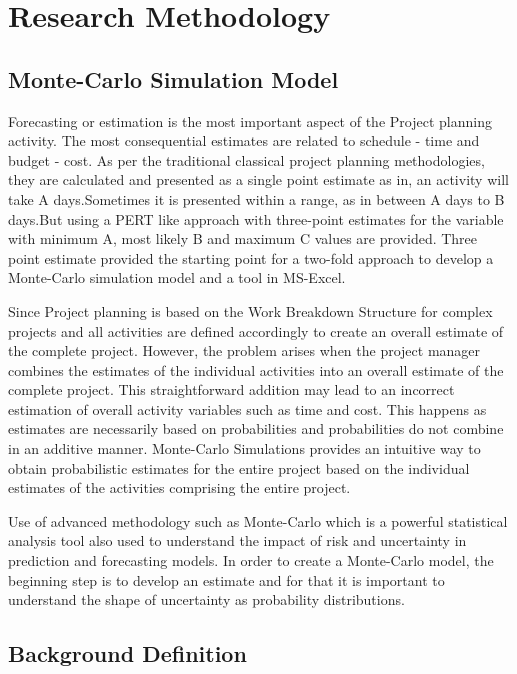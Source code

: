 \let\textcircled=\pgftextcircled
\chapter{Research Methodology}
\label{chap:RM}

\section{Monte-Carlo Simulation Model}

Forecasting or estimation is the most important aspect of the Project planning activity. The most consequential estimates are related to schedule - time and budget - cost. As per the traditional classical project planning methodologies, they are calculated and presented as a single point estimate as in, an activity will take A days.Sometimes it is presented within a range, as in between A days to B days.But using a PERT like approach with three-point estimates for the variable with minimum A, most likely B and maximum C values are provided. Three point estimate provided the starting point for a two-fold approach to develop a Monte-Carlo simulation model and a tool in MS-Excel.

Since Project planning is based on the Work Breakdown Structure for complex projects and all activities are defined accordingly to create an overall estimate of the complete project. However, the problem arises when the project manager combines the estimates of the individual activities into an overall estimate of the complete project. This straightforward addition may lead to an incorrect estimation of overall activity variables such as time and cost. This happens as estimates are necessarily based on probabilities and probabilities do not combine in an additive manner. Monte-Carlo Simulations provides an intuitive way to obtain probabilistic estimates for the entire project based on the individual estimates of the activities comprising the entire project. 

Use of advanced methodology such as Monte-Carlo which is a powerful statistical analysis tool also used to understand the impact of risk and uncertainty in prediction and forecasting models. In order to create a Monte-Carlo model, the beginning step is to develop an estimate and for that it is important to understand the shape of uncertainty as probability distributions.

\section{ Background Definition}


